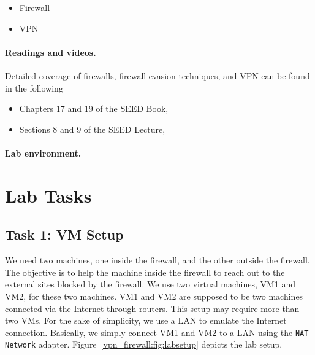 \begin{itemize}[noitemsep]
\item Firewall
\item VPN
\end{itemize}


\paragraph{Readings and videos.}
Detailed coverage of firewalls, firewall evasion techniques, and VPN can be found in
the following

\begin{itemize}
\item Chapters 17 and 19 of the SEED Book, \seedbook
\item Sections 8 and 9 of the SEED Lecture, \seedisvideo
\end{itemize}


\paragraph{Lab environment.} \seedenvironment
 


\section{Lab Tasks}




\subsection{Task 1: VM Setup}

 
We need two machines, one inside the firewall, and the other
outside the firewall. The objective is to help the machine
inside the firewall to reach out to the external sites blocked by the firewall. 
We use two virtual machines, VM1 and VM2, for these two machines. 
VM1 and VM2 are supposed to be two machines connected via the Internet through
routers. This setup may require more than two VMs. 
For the sake of simplicity, we use a LAN to emulate the Internet connection.
Basically, we simply connect VM1 and VM2 to a LAN using the \texttt{NAT Network} 
adapter. Figure~\ref{vpn_firewall:fig:labsetup} depicts the lab setup.

